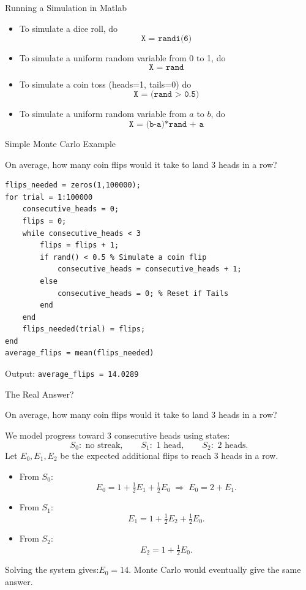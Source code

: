 \documentclass[10pt]{beamer}
\begin{document}
\begin{frame}{Running a Simulation in Matlab}
    \begin{itemize}
        \item To simulate a dice roll, do 
            $$\texttt{X = randi(6)}$$
        \item To simulate a uniform random variable from 0 to 1, do 
            $$\texttt{X = rand}$$
        \item To simulate a coin toss (heads=1, tails=0) do 
            $$\texttt{X = (rand > 0.5)}$$
        \item To simulate a uniform random variable from $a$ to $b$, do 
            $$\texttt{X = (b-a)*rand + a}$$
    \end{itemize}
\end{frame}
\begin{frame}[fragile]{Simple Monte Carlo Example}
    \begin{example}
        On average, how many coin flips would it take to land 3 heads in a row?
    \end{example}

\begin{lstlisting}[mathescape]
flips_needed = zeros(1,100000);
for trial = 1:100000
    consecutive_heads = 0;
    flips = 0;
    while consecutive_heads < 3
        flips = flips + 1;
        if rand() < 0.5 % Simulate a coin flip 
            consecutive_heads = consecutive_heads + 1;
        else
            consecutive_heads = 0; % Reset if Tails
        end
    end
    flips_needed(trial) = flips;
end
average_flips = mean(flips_needed)
\end{lstlisting}
Output: \texttt{average\_flips = 14.0289} 
\end{frame}
\begin{frame}{The Real Answer?}
    \begin{example}
        On average, how many coin flips would it take to land 3 heads in a row?
    \end{example}
We model progress toward 3 consecutive heads using states:
\[
S_0:\text{ no streak},\qquad
S_1:\text{ 1 head},\qquad
S_2:\text{ 2 heads}.
\]
Let $E_0,E_1,E_2$ be the expected additional flips to reach 3 heads in a row.

\medskip

\begin{itemize}
    \item From $S_0$: 
    \[
      E_0=1+\tfrac12E_1+\tfrac12E_0 \;\Rightarrow\; E_0=2+E_1.
    \]
    \item From $S_1$:
    \[
      E_1=1+\tfrac12E_2+\tfrac12E_0.
    \]
    \item From $S_2$:
    \[
      E_2=1+\tfrac12E_0.
    \]
\end{itemize}
Solving the system gives:$E_0=14$. Monte Carlo would eventually give the same answer.

\end{frame}
\end{document}
